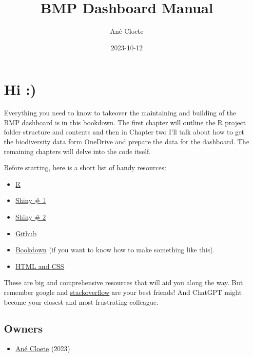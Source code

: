 \documentclass[
]{book}
\title{BMP Dashboard Manual}
\author{Ané Cloete}
\date{2023-10-12}
\providecommand{\tightlist}{%
  \setlength{\itemsep}{0pt}\setlength{\parskip}{0pt}}
\begin{document}
\maketitle

{
\setcounter{tocdepth}{1}
\tableofcontents
}
\hypertarget{hi}{%
\chapter{Hi :)}\label{hi}}

Everything you need to know to takeover the maintaining and building of the BMP dashboard is in this bookdown. The first chapter will outline the R project folder structure and contents and then in Chapter two I'll talk about how to get the biodiversity data form OneDrive and prepare the data for the dashboard. The remaining chapters will delve into the code itself.

Before starting, here is a short list of handy resources:

\begin{itemize}
\tightlist
\item
  \href{https://bookdown.org/yih_huynh/Guide-to-R-Book/}{R}
\item
  \href{https://shiny.posit.co/r/articles/\#user-interface}{Shiny \# 1}
\item
  \href{https://mastering-shiny.org/}{Shiny \# 2}
\item
  \href{https://happygitwithr.com/existing-github-last}{Github}
\item
  \href{https://bookdown.org/yihui/bookdown/get-started.html}{Bookdown} (if you want to know how to make something like this).
\item
  \href{https://unleash-shiny.rinterface.com/}{HTML and CSS}
\end{itemize}

These are big and comprehensive resources that will aid you along the way. But remember google and \href{https://stackoverflow.com/}{stackoverflow} are your best friends! And ChatGPT might become your closest and most frustrating colleague.

\hypertarget{owners}{%
\section{Owners}\label{owners}}

\begin{itemize}
\tightlist
\item
  \href{https://www.linkedin.com/in/an\%C3\%A9-c-95629ab5/}{Ané Cloete} (2023)
\end{itemize}
\end{document}
